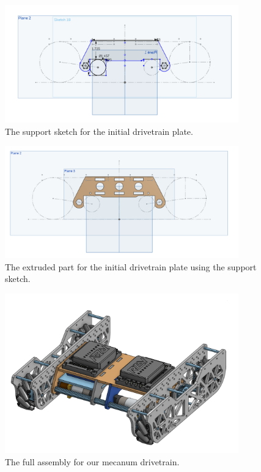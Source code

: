 \begin{figure}[htp]
\centering
\includegraphics[width=0.9\textwidth, angle=0]{Meetings/August/08-08-21/8-8-21_Image1-SupportSketch - Nathan Forrer.PNG}
\caption{The support sketch for the initial drivetrain plate.}
\label{fig:080821_1}
\end{figure}

\begin{figure}[htp]
\centering
\includegraphics[width=0.9\textwidth, angle=0]{Meetings/August/08-08-21/8-8-21_Image2-SupportPart - Nathan Forrer.PNG}
\caption{The extruded part for the initial drivetrain plate using the support sketch.}
\label{fig:080821_2}
\end{figure}

\begin{figure}[htp]
\centering
\includegraphics[width=0.9\textwidth, angle=0]{Meetings/August/08-08-21/8-8-21_Image3-Assembly1 - Nathan Forrer.PNG}
\caption{The full assembly for our mecanum drivetrain.}
\label{fig:080821_3}
\end{figure}

